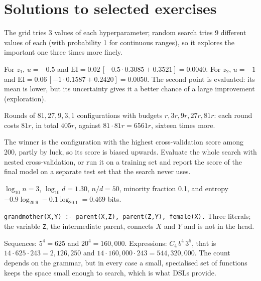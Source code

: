 \section*{Solutions to selected exercises}

\begin{description}[font=\bfseries,leftmargin=0pt,itemsep=5pt]
  \item[\ref{exr4:grid}] The grid tries 3 values of each hyperparameter; random search tries 9 different
        values of each (with probability 1 for continuous ranges), so it explores the important one three
        times more finely.
  \item[\ref{exr4:ei}] For $z_1$, $u=-0.5$ and $\mathrm{EI}=0.02\,[-0.5\cdot0.3085+0.3521]=0.0040$. For $z_2$,
        $u=-1$ and $\mathrm{EI}=0.06\,[-1\cdot0.1587+0.2420]=0.0050$. The second point is evaluated: its mean is
        lower, but its uncertainty gives it a better chance of a large improvement (exploration).
  \item[\ref{exr4:sh}] Rounds of $81,27,9,3,1$ configurations with budgets $r,3r,9r,27r,81r$: each round costs
        $81r$, in total $405r$, against $81\cdot81r=6561r$, sixteen times more.
  \item[\ref{exr4:optimism}] The winner is the configuration with the highest cross-validation score among
        200, partly by luck, so its score is biased upwards. Evaluate the whole search with nested
        cross-validation, or run it on a training set and report the score of the final model on a
        separate test set that the search never uses.
  \item[\ref{exr4:meta}] $\log_{10}n=3$, $\log_{10}d=1.30$, $n/d=50$, minority fraction 0.1, and entropy
        $-0.9\log_20.9-0.1\log_20.1=0.469$ bits.
  \item[\ref{exr4:ilp}] \texttt{grandmother(X,Y) :- parent(X,Z), parent(Z,Y), female(X).} Three literals; the
        variable \texttt{Z}, the intermediate parent, connects $X$ and $Y$ and is not in the head.
  \item[\ref{exr4:bias}] Sequences: $5^4=625$ and $20^4=160{,}000$. Expressions: $C_4\,b^4\,3^5$, that is
        $14\cdot625\cdot243=2{,}126{,}250$ and $14\cdot160{,}000\cdot243=544{,}320{,}000$. The count depends on the
        grammar, but in every case a small, specialised set of functions keeps the space small enough to
        search, which is what DSLs provide.

\end{description}
